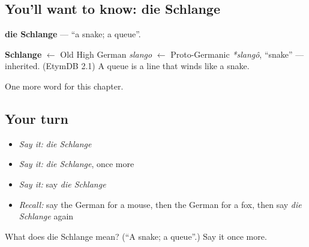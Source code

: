 \subsection*{You'll want to know: die Schlange}
\textbf{die Schlange} — \textquotedblleft{}a snake; a queue\textquotedblright{}.

\begin{cousinweb}
\textbf{Schlange} $\leftarrow$ Old High German \emph{slango} $\leftarrow$ Proto-Germanic \emph{*slangô}, \textquotedblleft{}snake\textquotedblright{} — inherited. (EtymDB 2.1) A queue is a line that winds like a snake.
\end{cousinweb}

\begin{grammarlens}[title={What you've built}]
One more word for this chapter.
\end{grammarlens}

\subsection*{Your turn}
\begin{itemize}
\raggedright
  \item \emph{Say it:} \emph{die Schlange}
  \item \emph{Say it:} \emph{die Schlange}, once more
  \item \emph{Say it:} say \emph{die Schlange}
  \item \emph{Recall:} say the German for a mouse, then the German for a fox, then say \emph{die Schlange} again
\end{itemize}

\begin{tcolorbox}[breakable,colback=teal!4,colframe=teal!35!black,title={Before you move on}]
What does die Schlange mean? (\textquotedblleft{}A snake; a queue\textquotedblright{}.) Say it once more.
\end{tcolorbox}
